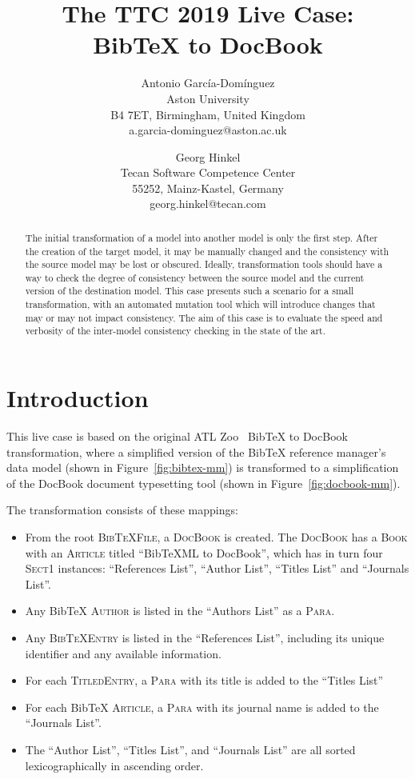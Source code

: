 \documentclass[a4paper]{article}
\title{The TTC 2019 Live Case:\\BibTeX to DocBook}
\author{
  Antonio García-Domínguez\\
  Aston University\\
  B4 7ET, Birmingham, United Kingdom\\
  a.garcia-dominguez@aston.ac.uk
  \and
  Georg Hinkel\\
  Tecan Software Competence Center\\
  55252, Mainz-Kastel, Germany\\
  georg.hinkel@tecan.com
}
\newcommand*{\class}[1]{\textsc{#1}}
\begin{document}
\maketitle

\begin{abstract}
  The initial transformation of a model into another model is only the first
  step. After the creation of the target model, it may be manually changed and
  the consistency with the source model may be lost or obscured. Ideally,
  transformation tools should have a way to check the degree of consistency
  between the source model and the current version of the destination model.
  This case presents such a scenario for a small transformation, with an
  automated mutation tool which will introduce changes that may or may not
  impact consistency. The aim of this case is to evaluate the speed and
  verbosity of the inter-model consistency checking in the state of the art.
\end{abstract}

\section{Introduction}

This live case is based on the original ATL Zoo~\cite{atlzoo} BibTeX to DocBook
transformation, where a simplified version of the BibTeX reference manager's
data model (shown in Figure~\ref{fig:bibtex-mm}) is transformed to a
simplification of the DocBook document typesetting tool (shown in
Figure~\ref{fig:docbook-mm}).

The transformation consists of these mappings:

\begin{itemize}
\item From the root \class{BibTeXFile}, a \class{DocBook} is created. The
  \class{DocBook} has a \class{Book} with an \class{Article} titled ``BibTeXML
  to DocBook'', which has in turn four \class{Sect1} instances: ``References
  List'', ``Author List'', ``Titles List'' and ``Journals List''.

\item Any BibTeX \class{Author} is listed in the ``Authors List'' as a \class{Para}.

\item Any \class{BibTeX\-Entry} is listed in the ``References List'', including
  its unique identifier and any available information.

\item For each \class{Titled\-Entry}, a \class{Para} with its title is added to
  the ``Titles List''

\item For each BibTeX \class{Article}, a \class{Para} with its journal name is
  added to the ``Journals List''.

\item The ``Author List'', ``Titles List'', and ``Journals List'' are all sorted
  lexicographically in ascending order.
\end{itemize}
\end{document}
